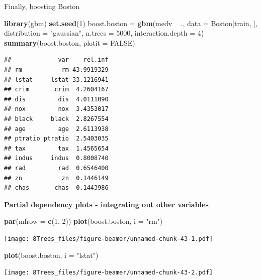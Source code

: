 \documentclass[10pt,ignorenonframetext,]{beamer}
\newenvironment{Shaded}{\begin{snugshade}}{\end{snugshade}}
\newcommand{\KeywordTok}[1]{\textcolor[rgb]{0.13,0.29,0.53}{\textbf{#1}}}
\newcommand{\DataTypeTok}[1]{\textcolor[rgb]{0.13,0.29,0.53}{#1}}
\newcommand{\DecValTok}[1]{\textcolor[rgb]{0.00,0.00,0.81}{#1}}
\newcommand{\StringTok}[1]{\textcolor[rgb]{0.31,0.60,0.02}{#1}}
\newcommand{\OtherTok}[1]{\textcolor[rgb]{0.56,0.35,0.01}{#1}}
\newcommand{\OperatorTok}[1]{\textcolor[rgb]{0.81,0.36,0.00}{\textbf{#1}}}
\newcommand{\NormalTok}[1]{#1}
\begin{document}
\begin{frame}[fragile]

\begin{block}{Finally, boosting Boston}

\begin{Shaded}
\begin{Highlighting}[]
\KeywordTok{library}\NormalTok{(gbm)}
\KeywordTok{set.seed}\NormalTok{(}\DecValTok{1}\NormalTok{)}
\NormalTok{boost.boston =}\StringTok{ }\KeywordTok{gbm}\NormalTok{(medv }\OperatorTok{~}\StringTok{ }\NormalTok{., }\DataTypeTok{data =}\NormalTok{ Boston[train, ], }\DataTypeTok{distribution =} \StringTok{"gaussian"}\NormalTok{, }
    \DataTypeTok{n.trees =} \DecValTok{5000}\NormalTok{, }\DataTypeTok{interaction.depth =} \DecValTok{4}\NormalTok{)}
\KeywordTok{summary}\NormalTok{(boost.boston, }\DataTypeTok{plotit =} \OtherTok{FALSE}\NormalTok{)}
\end{Highlighting}
\end{Shaded}

\begin{verbatim}
##             var    rel.inf
## rm           rm 43.9919329
## lstat     lstat 33.1216941
## crim       crim  4.2604167
## dis         dis  4.0111090
## nox         nox  3.4353017
## black     black  2.8267554
## age         age  2.6113938
## ptratio ptratio  2.5403035
## tax         tax  1.4565654
## indus     indus  0.8008740
## rad         rad  0.6546400
## zn           zn  0.1446149
## chas       chas  0.1443986
\end{verbatim}

\end{block}

\end{frame}

\begin{frame}[fragile]

\textbf{Partial dependency plots - integrating out other variables }

\begin{Shaded}
\begin{Highlighting}[]
\KeywordTok{par}\NormalTok{(}\DataTypeTok{mfrow =} \KeywordTok{c}\NormalTok{(}\DecValTok{1}\NormalTok{, }\DecValTok{2}\NormalTok{))}
\KeywordTok{plot}\NormalTok{(boost.boston, }\DataTypeTok{i =} \StringTok{"rm"}\NormalTok{)}
\end{Highlighting}
\end{Shaded}

\texttt{[image: 8Trees\_files/figure-beamer/unnamed-chunk-43-1.pdf]}

\begin{Shaded}
\begin{Highlighting}[]
\KeywordTok{plot}\NormalTok{(boost.boston, }\DataTypeTok{i =} \StringTok{"lstat"}\NormalTok{)}
\end{Highlighting}
\end{Shaded}

\texttt{[image: 8Trees\_files/figure-beamer/unnamed-chunk-43-2.pdf]}

\end{frame}
\end{document}
